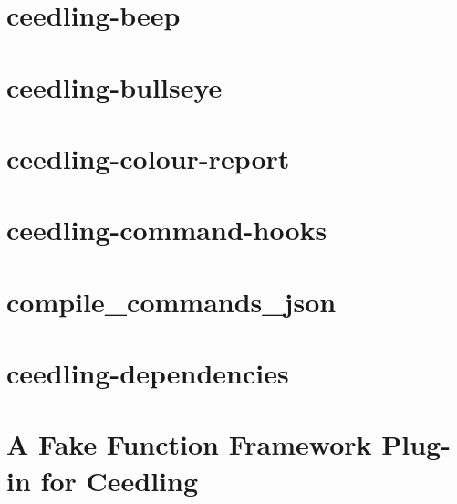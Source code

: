 \documentclass[twoside]{book}
\newcommand{\+}{\discretionary{\mbox{\scriptsize$\hookleftarrow$}}{}{}}
\begin{document}
\chapter{ceedling-\/beep}
\label{md_muju_vendor_ceedling_plugins_beep__r_e_a_d_m_e}

\chapter{ceedling-\/bullseye}
\label{md_muju_vendor_ceedling_plugins_bullseye__r_e_a_d_m_e}

\chapter{ceedling-\/colour-\/report}
\label{md_muju_vendor_ceedling_plugins_colour_report__r_e_a_d_m_e}

\chapter{ceedling-\/command-\/hooks}
\label{md_muju_vendor_ceedling_plugins_command_hooks__r_e_a_d_m_e}

\chapter{compile\+\_\+commands\+\_\+json}
\label{md_muju_vendor_ceedling_plugins_compile_commands_json__r_e_a_d_m_e}

\chapter{ceedling-\/dependencies}
\label{md_muju_vendor_ceedling_plugins_dependencies__r_e_a_d_m_e}

\chapter{A Fake Function Framework Plug-\/in for Ceedling}
\label{md_muju_vendor_ceedling_plugins_fake_function_framework__r_e_a_d_m_e}

\end{document}
